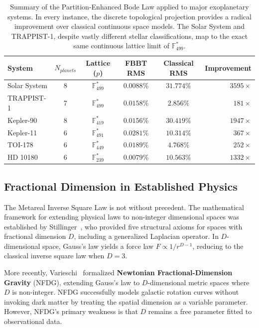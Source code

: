 \begin{table}[ht]
\centering
\renewcommand{\arraystretch}{1.3}
\begin{tabular}{@{}lccccr@{}}
\toprule
\textbf{System} & $N_{planets}$ & \textbf{Lattice ($p$)} & \textbf{FBBT RMS} & \textbf{Classical RMS} & \textbf{Improvement} \\
\midrule
Solar System & 8 & $\mathbb{F}_{499}^*$ & $0.0088\%$ & $31.774\%$ & $3595\times$ \\
TRAPPIST-1 & 7 & $\mathbb{F}_{499}^*$ & $0.0158\%$ & $2.856\%$ & $181\times$ \\
Kepler-90 & 8 & $\mathbb{F}_{419}^*$ & $0.0156\%$ & $30.419\%$ & $1947\times$ \\
Kepler-11 & 6 & $\mathbb{F}_{491}^*$ & $0.0281\%$ & $10.314\%$ & $367\times$ \\
TOI-178 & 6 & $\mathbb{F}_{449}^*$ & $0.0189\%$ & $4.768\%$ & $252\times$ \\
HD 10180 & 6 & $\mathbb{F}_{239}^*$ & $0.0079\%$ & $10.563\%$ & $1332\times$ \\
\bottomrule
\end{tabular}
\caption{Summary of the Partition-Enhanced Bode Law applied to major exoplanetary systems. In every instance, the discrete topological projection provides a radical improvement over classical continuous space models. The Solar System and TRAPPIST-1, despite vastly different stellar classifications, map to the exact same continuous lattice limit of $\mathbb{F}_{499}^*$.}
\label{tab:bode_summary}
\end{table}

\subsection{Fractional Dimension in Established Physics}
The Metareal Inverse Square Law is not without precedent. The mathematical framework for extending physical laws to non-integer dimensional spaces was established by Stillinger~\cite{stillinger1977}, who provided five structural axioms for spaces with fractional dimension $D$, including a generalized Laplacian operator. In $D$-dimensional space, Gauss's law yields a force law $F \propto 1/r^{D-1}$, reducing to the classical inverse square law when $D = 3$.

More recently, Varieschi~\cite{varieschi2020} formalized \textbf{Newtonian Fractional-Dimension Gravity} (NFDG), extending Gauss's law to $D$-dimensional metric spaces where $D$ is non-integer. NFDG successfully models galactic rotation curves without invoking dark matter by treating the spatial dimension as a variable parameter. However, NFDG's primary weakness is that $D$ remains a free parameter fitted to observational data.


